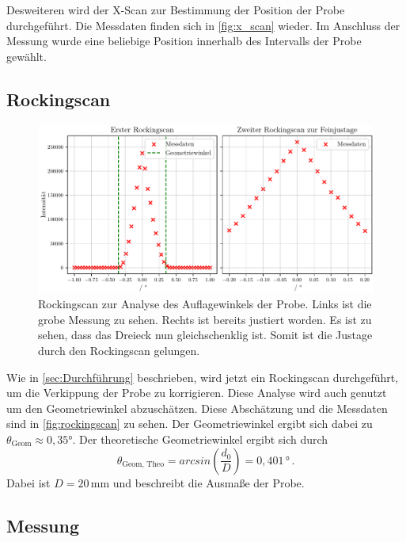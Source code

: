 Desweiteren wird der X-Scan zur Bestimmung der Position der Probe durchgeführt.
Die Messdaten finden sich in \autoref{fig:x_scan} wieder.
Im Anschluss der Messung wurde eine beliebige Position innerhalb des Intervalls der Probe gewählt.

\subsection{Rockingscan}

\begin{figure}
    \centering
    \includegraphics[width = 0.75 \linewidth]{build/rockingscan.pdf}
    \caption{Rockingscan zur Analyse des Auflagewinkels der Probe.
    Links ist die grobe Messung zu sehen.
    Rechts ist bereits justiert worden. Es ist zu sehen, dass das Dreieck nun gleichschenklig ist.
    Somit ist die Justage durch den Rockingscan gelungen.}
    \label{fig:rockingscan}
\end{figure}

Wie in \autoref{sec:Durchführung} beschrieben, wird jetzt ein Rockingscan durchgeführt, um die Verkippung der Probe zu korrigieren.
Diese Analyse wird auch genutzt um den Geometriewinkel abzuschätzen.
Diese Abschätzung und die Messdaten sind in \autoref{fig:rockingscan} zu sehen.
Der Geometriewinkel ergibt sich dabei zu $\theta_\text{Geom} \approx 0{,}35 °$.
Der theoretische Geometriewinkel ergibt sich durch 
\begin{equation*}
    \theta_\text{Geom, Theo} = arcsin\left(\frac{d_0}{D}\right) = 0{,}401 \, \unit\degree \, .
\end{equation*}
Dabei ist $D = 20 \, \unit{\milli\meter}$ und beschreibt die Ausmaße der Probe.

\subsection{Messung}

